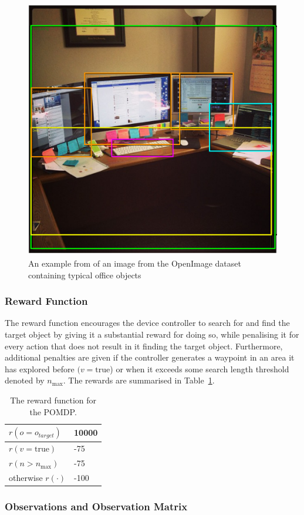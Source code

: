 \documentclass[runningheads]{llncs}
\begin{document}
\begin{figure}
  \centering
  \includegraphics[width=0.5\columnwidth]{figures/desk_example.png}
  \caption{An example from of an image from the OpenImage dataset~\cite{openimages} containing typical office objects}\label{fig:openimage}
\end{figure}

\subsubsection{Reward Function}

The reward function encourages the device controller to search for and find the target object by giving it a substantial reward for doing so, while penalising it for every action that does not result in it finding the target object.
Furthermore, additional penalties are given if the controller generates a waypoint in an area it has explored before $(v = \textrm{true}$) or when it exceeds some search length threshold denoted by $n_{\max}$.
The rewards are summarised in Table~\ref{tab:rewards}.

\begin{table}
  \centering
  \caption{The reward function for the POMDP. }\label{tab:rewards}
  \begin{tabular}{p{3cm}p{1cm}}
    \toprule
    $r(o = o_{target})$ & 10000 \\ \midrule
    $r(v = \textrm{true})$  & -75 \\ \midrule
    $r(n > n_{\max})$ & -75 \\ \midrule
    otherwise $r(\cdot)$ & -100  \\ \midrule
    \bottomrule
  \end{tabular}
\end{table}

\subsubsection{Observations and Observation Matrix}
\end{document}
